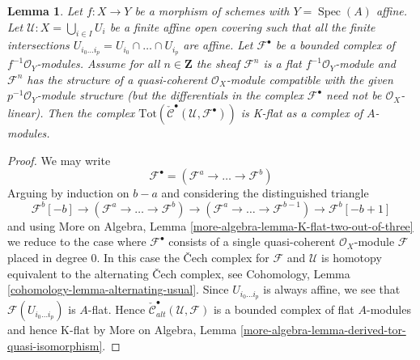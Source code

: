 \documentclass{stacks-project}
\theoremstyle{plain}
\newtheorem{lemma}[subsection]{Lemma}
\theoremstyle{definition}
\theoremstyle{remark}
\numberwithin{equation}{subsection}
\def\Spec{\mathop{\mathrm{Spec}}}
\begin{document}
\begin{lemma}
\label{lemma-K-flat}
Let $f : X \to Y$ be a morphism of schemes with $Y = \Spec(A)$ affine.
Let $\mathcal{U} : X = \bigcup_{i \in I} U_i$ be a finite affine open covering
such that all the finite intersections
$U_{i_0 \ldots i_p} = U_{i_0} \cap \ldots \cap U_{i_p}$
are affine. Let $\mathcal{F}^\bullet$ be a bounded complex of
$f^{-1}\mathcal{O}_Y$-modules. Assume for all $n \in \mathbf{Z}$
the sheaf $\mathcal{F}^n$ is a flat $f^{-1}\mathcal{O}_Y$-module and
$\mathcal{F}^n$ has the structure of a quasi-coherent $\mathcal{O}_X$-module
compatible with the given $p^{-1}\mathcal{O}_Y$-module structure (but the
differentials in the complex $\mathcal{F}^\bullet$ need not
be $\mathcal{O}_X$-linear). Then the complex
$\text{Tot}(\check{\mathcal{C}}^\bullet(\mathcal{U}, \mathcal{F}^\bullet))$
is K-flat as a complex of $A$-modules.
\end{lemma}

\begin{proof}
We may write
$$
\mathcal{F}^\bullet = (\mathcal{F}^a \to \ldots \to \mathcal{F}^b)
$$
Arguing by induction on $b - a$ and considering the distinguished triangle
$$
\mathcal{F}^b[-b] \to (\mathcal{F}^a \to \ldots \to \mathcal{F}^b)
\to (\mathcal{F}^a \to \ldots \to \mathcal{F}^{b - 1}) \to
\mathcal{F}^b[-b + 1]
$$
and using
More on Algebra, Lemma \ref{more-algebra-lemma-K-flat-two-out-of-three}
we reduce to the case where $\mathcal{F}^\bullet$ consists of a
single quasi-coherent $\mathcal{O}_X$-module $\mathcal{F}$
placed in degree $0$. In this case the {\v C}ech complex
for $\mathcal{F}$ and $\mathcal{U}$ is homotopy equivalent to the
alternating {\v C}ech complex, see
Cohomology, Lemma \ref{cohomology-lemma-alternating-usual}.
Since $U_{i_0 \ldots i_p}$ is always affine, we see that
$\mathcal{F}(U_{i_0 \ldots i_p})$ is $A$-flat.
Hence
$\check{\mathcal{C}}_{alt}^\bullet(\mathcal{U}, \mathcal{F})$
is a bounded complex of flat $A$-modules and hence K-flat
by More on Algebra, Lemma
\ref{more-algebra-lemma-derived-tor-quasi-isomorphism}.
\end{proof}
\end{document}
